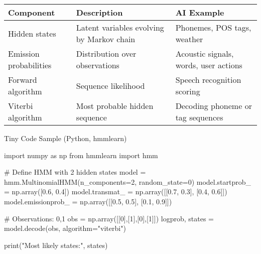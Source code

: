 \documentclass[
  letterpaper,
  DIV=11,
  numbers=noendperiod]{scrreprt}
\newenvironment{Shaded}{\begin{snugshade}}{\end{snugshade}}
\newcommand{\BuiltInTok}[1]{\textcolor[rgb]{0.00,0.23,0.31}{#1}}
\newcommand{\CommentTok}[1]{\textcolor[rgb]{0.37,0.37,0.37}{#1}}
\newcommand{\DecValTok}[1]{\textcolor[rgb]{0.68,0.00,0.00}{#1}}
\newcommand{\FloatTok}[1]{\textcolor[rgb]{0.68,0.00,0.00}{#1}}
\newcommand{\ImportTok}[1]{\textcolor[rgb]{0.00,0.46,0.62}{#1}}
\newcommand{\NormalTok}[1]{\textcolor[rgb]{0.00,0.23,0.31}{#1}}
\newcommand{\OperatorTok}[1]{\textcolor[rgb]{0.37,0.37,0.37}{#1}}
\newcommand{\StringTok}[1]{\textcolor[rgb]{0.13,0.47,0.30}{#1}}
\begin{document}
\begin{longtable}[]{@{}
  >{\raggedright\arraybackslash}p{}
  >{\raggedright\arraybackslash}p{}
  >{\raggedright\arraybackslash}p{}@{}}
\toprule\noalign{}
\begin{minipage}[b]{\linewidth}\raggedright
Component
\end{minipage} & \begin{minipage}[b]{\linewidth}\raggedright
Description
\end{minipage} & \begin{minipage}[b]{\linewidth}\raggedright
AI Example
\end{minipage} \\
\midrule\noalign{}
\endhead
\bottomrule\noalign{}
\endlastfoot
Hidden states & Latent variables evolving by Markov chain & Phonemes,
POS tags, weather \\
Emission probabilities & Distribution over observations & Acoustic
signals, words, user actions \\
Forward algorithm & Sequence likelihood & Speech recognition scoring \\
Viterbi algorithm & Most probable hidden sequence & Decoding phoneme or
tag sequences \\
\end{longtable}

Tiny Code Sample (Python, hmmlearn)

\begin{Shaded}
\begin{Highlighting}[]
\ImportTok{import}\NormalTok{ numpy }\ImportTok{as}\NormalTok{ np}
\ImportTok{from}\NormalTok{ hmmlearn }\ImportTok{import}\NormalTok{ hmm}

\CommentTok{\# Define HMM with 2 hidden states}
\NormalTok{model }\OperatorTok{=}\NormalTok{ hmm.MultinomialHMM(n\_components}\OperatorTok{=}\DecValTok{2}\NormalTok{, random\_state}\OperatorTok{=}\DecValTok{0}\NormalTok{)}
\NormalTok{model.startprob\_ }\OperatorTok{=}\NormalTok{ np.array([}\FloatTok{0.6}\NormalTok{, }\FloatTok{0.4}\NormalTok{])}
\NormalTok{model.transmat\_ }\OperatorTok{=}\NormalTok{ np.array([[}\FloatTok{0.7}\NormalTok{, }\FloatTok{0.3}\NormalTok{],}
\NormalTok{                            [}\FloatTok{0.4}\NormalTok{, }\FloatTok{0.6}\NormalTok{]])}
\NormalTok{model.emissionprob\_ }\OperatorTok{=}\NormalTok{ np.array([[}\FloatTok{0.5}\NormalTok{, }\FloatTok{0.5}\NormalTok{],}
\NormalTok{                                [}\FloatTok{0.1}\NormalTok{, }\FloatTok{0.9}\NormalTok{]])}

\CommentTok{\# Observations: 0,1}
\NormalTok{obs }\OperatorTok{=}\NormalTok{ np.array([[}\DecValTok{0}\NormalTok{],[}\DecValTok{1}\NormalTok{],[}\DecValTok{0}\NormalTok{],[}\DecValTok{1}\NormalTok{]])}
\NormalTok{logprob, states }\OperatorTok{=}\NormalTok{ model.decode(obs, algorithm}\OperatorTok{=}\StringTok{"viterbi"}\NormalTok{)}

\BuiltInTok{print}\NormalTok{(}\StringTok{"Most likely states:"}\NormalTok{, states)}
\end{Highlighting}
\end{Shaded}
\end{document}
